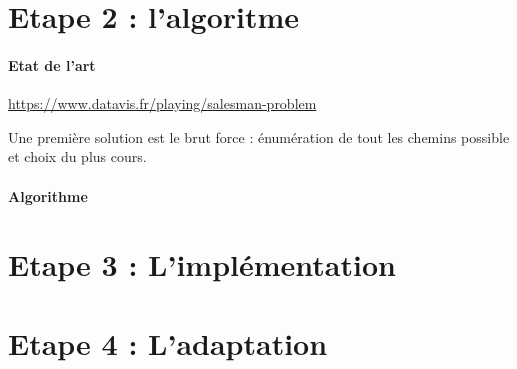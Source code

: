 \documentclass[11pt,a4paper]{article}
\begin{document}
\section{Etape 2 : l'algoritme}
\paragraph{Etat de l'art}
\url{https://www.datavis.fr/playing/salesman-problem}

Une première solution est le brut force : énumération de tout les chemins possible et choix du plus cours. 
\paragraph{Algorithme}

\section{Etape 3 : L'implémentation}
\section{Etape 4 : L'adaptation}
\end{document}
